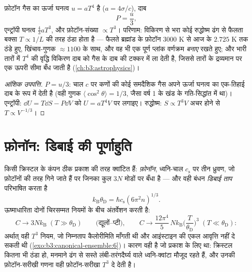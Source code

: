 \begin{proposition}[प्रकाश की ऊष्मागतिकी]\label{prop:b3:photons-phonons:thermo}
फ़ोटॉन गैस का ऊर्जा घनत्व $u = aT^4$ है ($a =
4\sigma/c$), दाब
\[
P = \frac u3 ,
\]
एन्ट्रॉपी घनत्व $\tfrac43 aT^3$, और फ़ोटॉन-संख्या $\propto T^3$।
परिणाम: विकिरण से भरा कोई रुद्धोष्म ढंग से फैलता बक्सा
$T \propto 1/L$ की तरह ठंडा होता है --- फैलते ब्रह्मांड के फ़ोटॉन
$3000$ K से आज के $2.725$ K तक ठंडे हुए, खिंचाव-गुणक
$\approx1100$ के साथ, और वह भी एक पूर्ण प्लांक वर्णक्रम \emph{बनाए}
रखते हुए; और भारी तारों में $T^4$ की वृद्धि विकिरण दाब को गैस के
दाब की टक्कर में ला देती है, जिससे तारों के द्रव्यमान पर एक ऊपरी
सीमा बँध जाती है (\cref{ch:b3:astrophysics})।
\end{proposition}

\begin{proof}[आंशिक उपपत्ति]
$P = u/3$: चाल $c$ पर कणों की कोई समदैशिक गैस अपने ऊर्जा घनत्व का
एक-तिहाई दाब के रूप में देती है (वही गुणक $\langle
\cos^2\theta\rangle = 1/3$, जैसा वर्ष 1 के खंड के गति-सिद्धांत में
था)। एन्ट्रॉपी: $\dd U = T\dd S - P\dd V$ को $U =
aT^4V$ पर लगाइए। रुद्धोष्म: $S \propto T^3V$
अचर होने से $T \propto
V^{-1/3}$।
\end{proof}

\section{फ़ोनॉन: डिबाई की पूर्णाहुति}

\begin{theorem}[डिबाई प्रतिरूप]\label{thm:b3:photons-phonons:debye}
किसी क्रिस्टल के कंपन ठीक प्रकाश की तरह क्वांटित 
हैं: \emph{फ़ोनॉन}, ध्वनि-चाल
$c_{\text{s}}$ पर तीन ध्रुवण, जो फ़ोटॉनों की तरह गिने जाते हैं पर
जिनका कुल $3N$ मोडों पर बँधा है --- और वही बंधन \emph{डिबाई ताप}
परिभाषित करता है
\[
k_{\text{B}}\theta_{\text{D}} = \hbar c_{\text{s}}
(6\pi^2n)^{1/3} .
\]
ऊष्माधारिता दोनों चिरसम्मत नियमों के बीच अंतर्वेशन करती है:
\[
C \to 3Nk_{\text{B}} \;(T \gg \theta_{\text{D}})
\qquad\text{(द्यूलों--प्टी)} ,
\qquad
C \to \frac{12\pi^4}{5}\,Nk_{\text{B}}
\Big(\frac{T}{\theta_{\text{D}}}\Big)^3
\;(T \ll \theta_{\text{D}}) :
\]
अर्थात् वही $T^3$ नियम, जो निम्नताप कैलोरीमिति माँगती थी और
आइंस्टाइन की एकल आवृत्ति नहीं दे सकती थी
(\cref{exo:b3:canonical-ensemble:6})। कारण वही है जो
प्रकाश के लिए था: क्रिस्टल कितना भी ठंडा हो, मनमाने ढंग से सस्ते
लंबी-तरंगदैर्घ्य वाले ध्वनि-क्वांटा मौजूद रहते हैं, और उनकी
फ़ोटॉन-सरीखी गणना वही फ़ोटॉन-सरीखा $T^3$ दे देती है।
\end{theorem}

